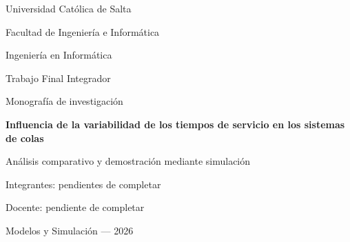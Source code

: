 \documentclass[12pt,a4paper]{article}
\begin{document}
\begin{titlepage}
  \centering
  {\large Universidad Católica de Salta\par}
  \medskip
  {\large Facultad de Ingeniería e Informática\par}
  {\large Ingeniería en Informática\par}
  \vfill
  {\large Trabajo Final Integrador\par}
  {\large Monografía de investigación\par}
  \bigskip
  {\LARGE\bfseries Influencia de la variabilidad de los tiempos de servicio
    en los sistemas de colas\par}
  \bigskip
  {\Large Análisis comparativo y demostración mediante simulación\par}
  \vfill
  Integrantes: pendientes de completar\par
  \medskip
  Docente: pendiente de completar\par
  \vfill
  Modelos y Simulación --- 2026\par
\end{titlepage}

\tableofcontents
\clearpage







\clearpage
{}
{}


\end{document}
